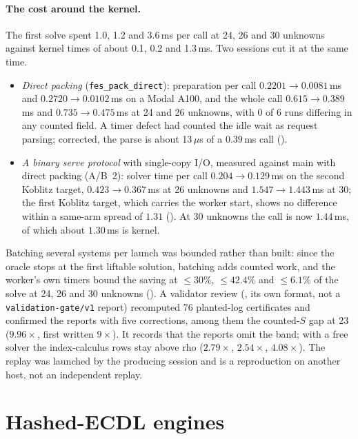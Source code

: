 \paragraph{The cost around the kernel.} The first solve spent 1.0, 1.2 and
3.6\,ms per call at 24, 26 and 30 unknowns against kernel times of about
0.1, 0.2 and 1.3\,ms. Two sessions cut it at the same time.
\begin{itemize}
\item \emph{Direct packing} (\texttt{fes\_pack\_direct}): preparation per
  call $0.2201\to0.0081$\,ms and $0.2720\to0.0102$\,ms on a Modal A100, and
  the whole call $0.615\to0.389$\,ms and $0.735\to0.475$\,ms at 24 and 26
  unknowns, with 0 of 6 runs differing in any counted field. A timer defect
  had counted the idle wait as request parsing; corrected, the parse is
  about 13\,$\mu$s of a $0.39$\,ms call
  ().
\item \emph{A binary serve protocol} with single-copy I/O, measured against
  main with direct packing (A/B~2): solver time per call $0.204\to0.129$\,ms
  on the second Koblitz target, $0.423\to0.367$\,ms at 26 unknowns and
  $1.547\to1.443$\,ms at 30; the first Koblitz target, which carries the
  worker start, shows no difference within a same-arm spread of $1.31$
  (). At 30 unknowns the
  call is now $1.44$\,ms, of which about $1.30$\,ms is kernel.
\end{itemize}
Batching several systems per launch was bounded rather than built: since
the oracle stops at the first liftable solution, batching adds counted
work, and the worker's own timers bound the saving at $\le30\%$, $\le42.4\%$
and $\le6.1\%$ of the solve at 24, 26 and 30 unknowns
(). A validator review
(, its own format,
not a \texttt{validation-gate/v1} report) recomputed 76 planted-log
certificates and confirmed the reports with five corrections, among them
the counted-$S$ gap at 23 ($9.96\times$, first written $9\times$). It
records that the reports omit the band; with a free solver the
index-calculus rows stay above rho ($2.79\times$, $2.54\times$, $4.08\times$).
The replay was launched by the producing session and is a reproduction on
another host, not an independent replay.

\section{Hashed-ECDL engines}\label{sec:in-hashed}

